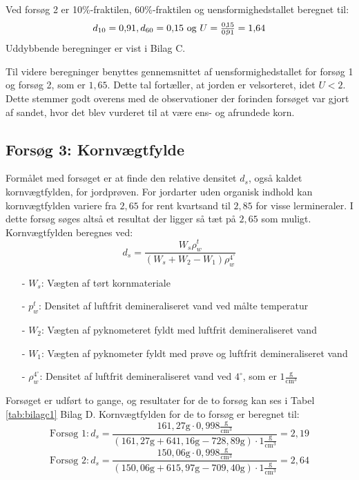 Ved forsøg 2 er 10\%-fraktilen, 60\%-fraktilen og uensformighedstallet beregnet til:
\begin{equation}
	d_{10} = 0,\!91, d_{60} = 0,\!15$ \text{og} $U = \frac{0,\!15}{0,\!91} = 1,\!64
\end{equation} 
Uddybbende beregninger er vist i Bilag C.

Til videre beregninger benyttes gennemsnittet af uensformighedstallet for forsøg 1 og forsøg 2, som er $1,\!65$. Dette tal fortæller, at jorden er velsorteret, idet $U<2$. Dette stemmer godt overens med de observationer der forinden forsøget var gjort af sandet, hvor det blev vurderet til at være ens- og afrundede korn. 

\subsection{Forsøg 3: Kornvægtfylde}
Formålet med forsøget er at finde den relative densitet $d_s$, også kaldet kornvægtfylden, for jordprøven. For jordarter uden organisk indhold kan kornvægtfylden variere fra $2,\!65$ for rent kvartsand til $2,\!85$ for visse lermineraler. I dette forsøg søges altså et resultat der ligger så tæt på $2,\!65$ som muligt.
\newline
\newline
Kornvægtfylden beregnes ved:
\begin{equation}
	d_s = \frac{W_s \rho_w^t}{(W_s + W_2 - W_1)\rho_w^{4^{\circ}}}
\end{equation}

\begin{itemize}
	\item[-] $W_s$: Vægten af tørt kornmateriale
	\item[-] $p_w^t$: Densitet af luftfrit demineraliseret vand ved målte temperatur 
	\item[-] $W_2$: Vægten af pyknometeret fyldt med luftfrit demineraliseret vand
	\item[-] $W_1$: Vægten af pyknometer fyldt med prøve og luftfrit demineraliseret vand
	\item[-] $\rho_w^{4^{\circ}}$: Densitet af luftfrit demineraliseret vand ved $4^{\circ}$, som er $1 \frac{\text{g}}{\text{cm}^3}$
\end{itemize}

Forsøget er udført to gange, og resultater for de to forsøg kan ses i Tabel \ref{tab:bilagc1} Bilag D. Kornvægtfylden for de to forsøg er beregnet til:
\begin{equation}
	\text{Forsøg 1}: d_{s} = \frac{161,\!27 \text{g} \cdot 0,\!998 \frac{\text{g}}{\text{cm}^3}}{(161,\!27 \text{g} + 641,\!16 \text{g} - 728,\!89 \text{g})\cdot 1 \frac{\text{g}}{\text{cm}^3}} = 2,\!19
\end{equation}
\begin{equation}
	\text{Forsøg 2}: d_{s} = \frac{150,\!06 \text{g} \cdot 0,\!998 \frac{\text{g}}{\text{cm}^3}}{(150,\!06 \text{g} + 615,\!97 \text{g} - 709,\!40 \text{g})\cdot 1 \frac{\text{g}}{\text{cm}^3}} = 2,\!64
\end{equation} 

